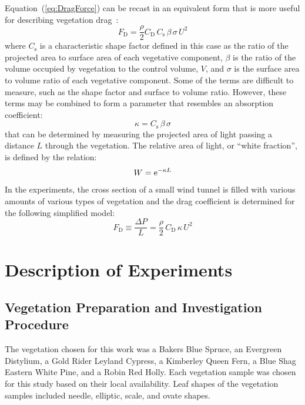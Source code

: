 \documentclass[12pt]{article}
\begin{document}
Equation~(\ref{eq:DragForce}) can be recast in an equivalent form that is more useful for describing vegetation drag~\cite{Mueller2014}:
\begin{equation}
\label{eq:DragForcea}
F_{\mathrm{D}}  = \frac{\rho}{2} C_{\mathrm{D}} \, C_{\mathrm{s}} \, \beta \, \sigma \, U^2
\end{equation}
where $C_{\mathrm{s}}$ is a characteristic shape factor defined in this case as the ratio of the projected area to surface area of each vegetative component, $\beta$ is the ratio of the volume occupied by vegetation to the control volume, $V$, and $\sigma$ is the surface area to volume ratio of each vegetative component. Some of the terms are difficult to measure, such as the shape factor and surface to volume ratio. However, these terms may be combined to form a parameter that resembles an absorption coefficient:
\begin{equation}
\label{eq:WhiteFraction} 
\kappa = C_{\mathrm{s}} \, \beta \, \sigma 
\end{equation}
that can be determined by measuring the projected area of light passing a distance $L$ through the vegetation. The relative area of light, or ``white fraction'', is defined by the relation:
\begin{equation}\label{eq:WhiteFraction}
W = {\rm e}^{-\kappa L}
\end{equation}
In the experiments, the cross section of a small wind tunnel is filled with various amounts of various types of vegetation and the drag coefficient is determined for the following simplified model:
\begin{equation}\label{eq:Pressure}
F_{\mathrm{D}} \equiv \frac{\Delta P}{L}  = \frac{\rho}{2} \, C_{\mathrm{D}} \, \kappa \, U^2
\end{equation}



\section{Description of Experiments}
\label{sec:Experiments}
\subsection{Vegetation Preparation and Investigation Procedure}
\label{ssec:headingscap}

The vegetation chosen for this work was a Bakers Blue Spruce, an Evergreen Distylium, a Gold Rider Leyland Cypress, a Kimberley Queen Fern, a Blue Shag Eastern White Pine, and a Robin Red Holly. Each vegetation sample was chosen for this study based on their local availability. Leaf shapes of the vegetation samples included needle, elliptic, scale, and ovate shapes.
\end{document}
